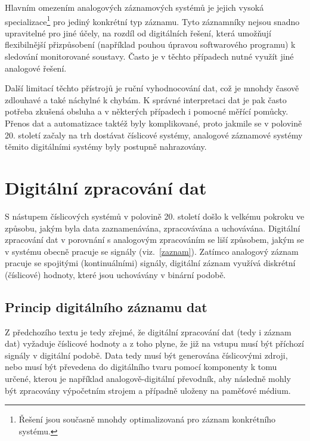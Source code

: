 Hlavním omezením analogových záznamových systémů je jejich vysoká specializace\footnote{Řešení jsou současně mnohdy optimalizovaná pro záznam konkrétního systému.} pro jediný konkrétní typ záznamu. Tyto záznamníky nejsou snadno upravitelné pro jiné účely, na rozdíl od digitálních řešení, která umožňují flexibilnější přizpůsobení (například pouhou úpravou softwarového programu) k sledování monitorované soustavy. Často je v těchto případech nutné využít jiné analogové řešení. \cite{analog_signal_and_digital_signal_processing_Tel_System}

Další limitací těchto přístrojů je ruční vyhodnocování dat, což je mnohdy časově zdlouhavé a také náchylné k chybám. K správné interpretaci dat je pak často potřeba zkušená obsluha a v některých případech i pomocné měřící pomůcky. Přenos dat a automatizace taktéž byly komplikované, proto jakmile se v polovině 20. století začaly na trh dostávat číslicové systémy, analogové záznamové systémy těmito digitálními systémy byly postupně nahrazovány. \cite{newcastle_history_of_digital_computers, florian_prechod_a_analog_do_digital, rcp_analog_vs_digital}


\section{Digitální zpracování dat}
\label{digitalni_zaznam_dat}
S nástupem číslicových systémů v polovině 20. století došlo k velkému pokroku ve způsobu, jakým byla data zaznamenávána, zpracovávána a uchovávána. Digitální zpracování dat v porovnání s analogovým zpracováním se liší způsobem, jakým se v systému obecně pracuje se signály (viz.~\ref{zaznam}). Zatímco analogový záznam pracuje se spojitými (kontinuálními) signály, digitální záznam využívá diskrétní (číslicové) hodnoty, které jsou uchovávány v binární podobě.

\subsection{Princip digitálního záznamu dat}
Z předchozího textu je tedy zřejmé, že digitální zpracování dat (tedy i záznam dat) vyžaduje číslicové hodnoty a z toho plyne, že již na vstupu musí být příchozí signály v digitální podobě. Data tedy musí být generována číslicovými zdroji, nebo musí být převedena do digitálního tvaru pomocí komponenty k tomu určené, kterou je například analogově-digitální převodník, aby následně mohly být zpracovány výpočetním strojem a případně uloženy na paměťové médium.

